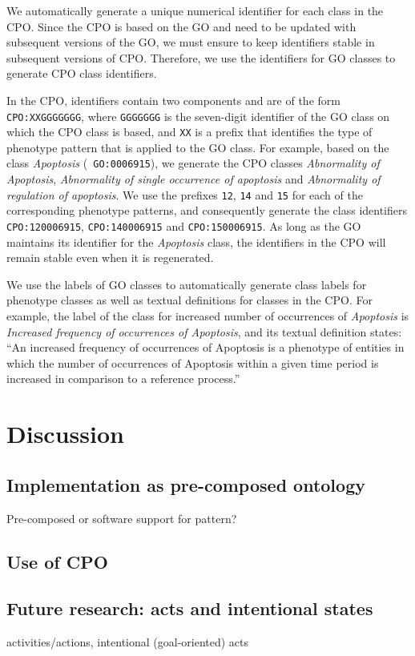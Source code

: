 \documentclass{bioinfo}
\begin{document}
We automatically generate a unique numerical identifier for each class
in the CPO.  Since the CPO is based on the GO and need to be updated
with subsequent versions of the GO, we must ensure to keep identifiers
stable in subsequent versions of CPO. Therefore, we use the
identifiers for GO classes to generate CPO class identifiers.

In the CPO, identifiers contain two components and are of the form
{\tt CPO:XXGGGGGGG}, where {\tt GGGGGGG} is the seven-digit identifier
of the GO class on which the CPO class is based, and {\tt XX} is a
prefix that identifies the type of phenotype pattern that is applied
to the GO class. For example, based on the class {\em Apoptosis} ({\tt
  GO:0006915}), we generate the CPO classes {\em Abnormality of
  Apoptosis}, {\em Abnormality of single occurrence of apoptosis} and
{\em Abnormality of regulation of apoptosis}.  We use the prefixes
{\tt 12}, {\tt 14} and {\tt 15} for each of the corresponding
phenotype patterns, and consequently generate the class identifiers
{\tt CPO:120006915}, {\tt CPO:140006915} and {\tt CPO:150006915}. As
long as the GO maintains its identifier for the {\em Apoptosis} class,
the identifiers in the CPO will remain stable even when it is
regenerated.

We use the labels of GO classes to automatically generate class labels
for phenotype classes as well as textual definitions for classes in
the CPO. For example, the label of the class for increased number of
occurrences of {\em Apoptosis} is {\em Increased frequency of
  occurrences of Apoptosis}, and its textual definition states: ``An
increased frequency of occurrences of Apoptosis is a phenotype of
entities in which the number of occurrences of Apoptosis within a
given time period is increased in comparison to a reference process.''

\section{Discussion}
\subsection{Implementation as pre-composed ontology}
Pre-composed or software support for pattern?

\subsection{Use of CPO}

\subsection{Future research: acts and intentional states}
activities/actions, intentional (goal-oriented) acts
\end{document}
